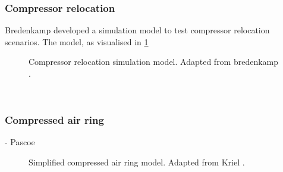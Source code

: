 \subsubsection{Compressor relocation}
Bredenkamp \cite{Bredenkamp2013Masters} developed a simulation model to test compressor relocation scenarios. The model, as visualised in \cref{fig: bredenkamp  model}
\begin{figure}[h!]
	\centering
	\caption[Compressor relocation simulation model.]{Compressor relocation simulation model. Adapted from bredenkamp \cite{Bredenkamp2013Masters}.}
	\label{fig: bredenkamp  model}
\end{figure} 
\\
\subsubsection{Compressed air ring}
- Pascoe \\
\begin{figure}[h!]
	\centering
	\caption[Simplified compressed air ring model.]{Simplified compressed air ring model. Adapted from Kriel \cite{Pascoe2016Masters}.}
	\label{fig:kriel  model}
\end{figure}

